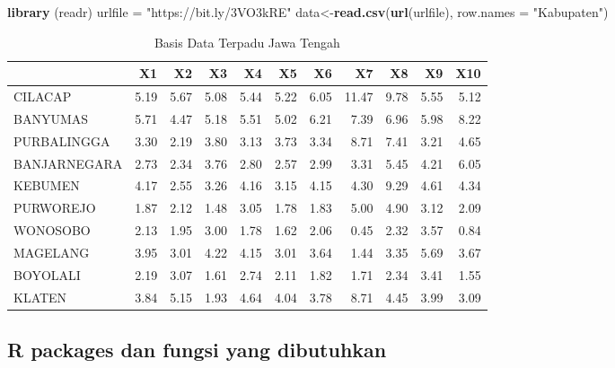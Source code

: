 \documentclass[
  oneside]{book}
\newenvironment{Shaded}{\begin{snugshade}}{\end{snugshade}}
\newcommand{\AttributeTok}[1]{\textcolor[rgb]{0.13,0.29,0.53}{#1}}
\newcommand{\FunctionTok}[1]{\textcolor[rgb]{0.13,0.29,0.53}{\textbf{#1}}}
\newcommand{\NormalTok}[1]{#1}
\newcommand{\OtherTok}[1]{\textcolor[rgb]{0.56,0.35,0.01}{#1}}
\newcommand{\StringTok}[1]{\textcolor[rgb]{0.31,0.60,0.02}{#1}}
\begin{document}
\begin{Shaded}
\begin{Highlighting}[]
\FunctionTok{library}\NormalTok{ (readr)}
\NormalTok{urlfile }\OtherTok{=} \StringTok{"https://bit.ly/3VO3kRE"}
\NormalTok{data}\OtherTok{\textless{}{-}}\FunctionTok{read.csv}\NormalTok{(}\FunctionTok{url}\NormalTok{(urlfile), }\AttributeTok{row.names =} \StringTok{"Kabupaten"}\NormalTok{)}
\end{Highlighting}
\end{Shaded}

\begin{table}

\caption{\label{tab:nice-tab-1}Basis Data Terpadu Jawa Tengah}
\centering
\begin{tabular}[t]{lrrrrrrrrrr}
\toprule
  & X1 & X2 & X3 & X4 & X5 & X6 & X7 & X8 & X9 & X10\\
\midrule
CILACAP & 5.19 & 5.67 & 5.08 & 5.44 & 5.22 & 6.05 & 11.47 & 9.78 & 5.55 & 5.12\\
BANYUMAS & 5.71 & 4.47 & 5.18 & 5.51 & 5.02 & 6.21 & 7.39 & 6.96 & 5.98 & 8.22\\
PURBALINGGA & 3.30 & 2.19 & 3.80 & 3.13 & 3.73 & 3.34 & 8.71 & 7.41 & 3.21 & 4.65\\
BANJARNEGARA & 2.73 & 2.34 & 3.76 & 2.80 & 2.57 & 2.99 & 3.31 & 5.45 & 4.21 & 6.05\\
KEBUMEN & 4.17 & 2.55 & 3.26 & 4.16 & 3.15 & 4.15 & 4.30 & 9.29 & 4.61 & 4.34\\
\addlinespace
PURWOREJO & 1.87 & 2.12 & 1.48 & 3.05 & 1.78 & 1.83 & 5.00 & 4.90 & 3.12 & 2.09\\
WONOSOBO & 2.13 & 1.95 & 3.00 & 1.78 & 1.62 & 2.06 & 0.45 & 2.32 & 3.57 & 0.84\\
MAGELANG & 3.95 & 3.01 & 4.22 & 4.15 & 3.01 & 3.64 & 1.44 & 3.35 & 5.69 & 3.67\\
BOYOLALI & 2.19 & 3.07 & 1.61 & 2.74 & 2.11 & 1.82 & 1.71 & 2.34 & 3.41 & 1.55\\
KLATEN & 3.84 & 5.15 & 1.93 & 4.64 & 4.04 & 3.78 & 8.71 & 4.45 & 3.99 & 3.09\\
\bottomrule
\end{tabular}
\end{table}

\subsection*{R packages dan fungsi yang dibutuhkan}\label{r-packages-dan-fungsi-yang-dibutuhkan}
\end{document}
